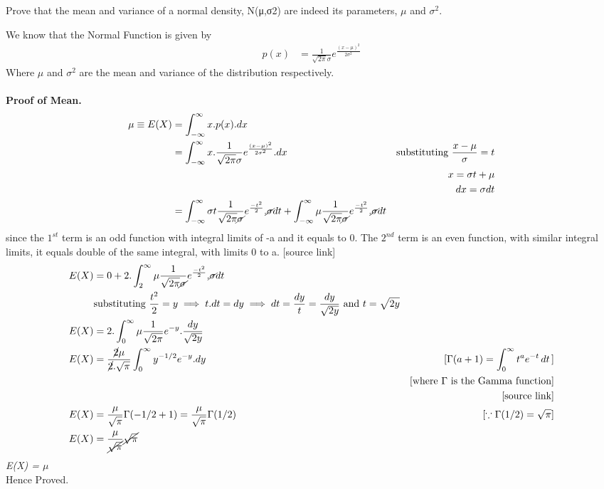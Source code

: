 \begin{Problem}
    Prove that the mean and variance of a normal density, N(μ,σ2) are indeed its parameters, $\mu$ and $\sigma^2$.
    \end{Problem}
    \begin{Solution}
    We know that the Normal Function is given by \\
    \begin{align}
        p(x) &= \frac{1}{\sqrt{2\pi}\sigma}e^{\frac{(x-\mu)^2}{2\sigma^2}}
    \end{align}
    Where $\mu$ and $\sigma^2$ are the mean and variance of the distribution respectively.\\\\
    \textbf{Proof of Mean.}
    \begin{align*}
        \mu \equiv E(X) &= \int_{-\infty}^{\infty}x.p(x).dx\\
        &= \int_{-\infty}^{\infty}x.\frac{1}{\sqrt{2\pi}\sigma}e^{\frac{(x-\mu)^2}{2\sigma^2}}.dx & \text{substituting } \frac{x-\mu}{\sigma} = t\\
        &&x = \sigma t + \mu \\
        &&dx = \sigma dt \\ 
        &=\int_{-\infty}^{\infty}\sigma t\frac{1}{\sqrt{2\pi}\cancel{\sigma}}e^{\frac{-t^2}{2}}.\cancel{\sigma}dt  + \int_{-\infty}^{\infty}\mu \frac{1}{\sqrt{2\pi}\cancel{\sigma}}e^{{\frac{-t^2}{2}}}.\cancel{\sigma}dt\\
    \end{align*}
        since the $1^{st}$ term is an odd function with integral limits of -a and it equals to 0. The $2^{nd}$ term is an even function, with similar integral limits, it equals double of the same integral, with limits 0 to a. [source link]
    \begin{align*}
        E(X)&= 0 + 2.\int_{2}^{\infty}\mu \frac{1}{\sqrt{2\pi}\cancel{\sigma}}e^{{\frac{-t^2}{2}}}.\cancel{\sigma}dt\\
        & \text{substituting } \frac{t^2}{2} = y \implies t.dt = dy \implies dt = \frac{dy}{t} = \frac{dy}{\sqrt{2y}} \text{ and } t = \sqrt{2y}\\
        E(X) &=  2.\int_{0}^{\infty}\mu \frac{1}{\sqrt{2\pi}}e^{-y}.\frac{dy}{\sqrt{2y}} \\
        E(X) &= \frac{\cancel{2}\mu}{\cancel{2}.\sqrt{\pi}}\int_{0}^{\infty}y^{-1/2}e^{-y}.dy &[\Gamma(a+1)=\int_0^{\infty}t^ae^{-t}\,dt\,]\\
        &&\text{[where $\Gamma$ is the Gamma function]}\\
        &&\text{[source link]}\\
        E(X)&= \frac{\mu}{\sqrt{\pi}}\Gamma(-1/2 + 1) = \frac{\mu}{\sqrt{\pi}}\Gamma(1/2)&[\because \Gamma(1/2) = \sqrt{\pi}]\\
        E(X) &= \frac{\mu}{\cancel{\sqrt{\pi}}}\cancel{\sqrt{\pi}}\\
    \end{align*}
        \therefore \textit{E(X) = $\mu$}\\
        Hence Proved.\\\\
        

\end{Solution}

